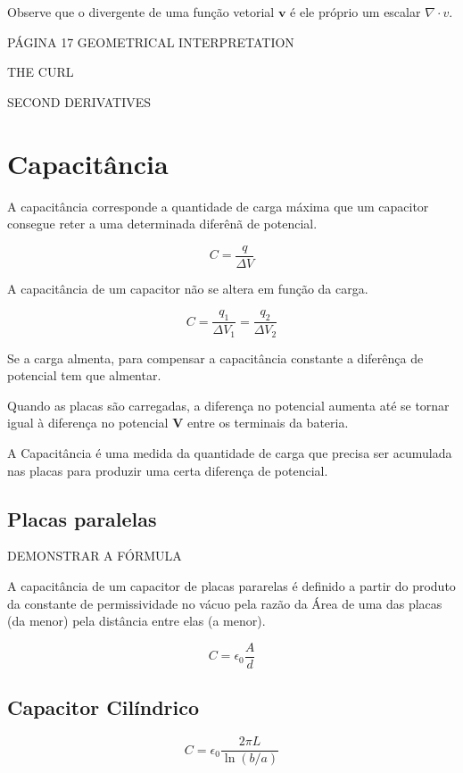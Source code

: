 Observe que o divergente de uma função vetorial $\textbf{v}$ é ele próprio um escalar $\nabla \cdot v$.

PÁGINA 17 GEOMETRICAL INTERPRETATION

THE CURL

SECOND DERIVATIVES

\section{Capacitância}

A capacitância corresponde a quantidade de carga máxima que um capacitor consegue reter a uma determinada diferênã de potencial.

$$C=\dfrac{q}{\Delta V}$$

A capacitância de um capacitor não se altera em função da carga.

$$C=\dfrac{q_1}{\Delta V_1}=\dfrac{q_2}{\Delta V_2}$$

Se a carga almenta, para compensar a capacitância constante a diferênça de potencial tem que almentar.

Quando as placas são carregadas, a diferença no potencial aumenta até se tornar igual à diferença no potencial \textbf{V} entre os terminais da bateria.

A Capacitância é uma medida da quantidade de carga que precisa ser acumulada nas placas para produzir uma certa diferença de potencial.

\subsection{Placas paralelas}

DEMONSTRAR A FÓRMULA

A capacitância de um capacitor de placas pararelas é definido a partir do produto da constante de permissividade no vácuo pela razão da Área de uma das placas (da menor) pela distância entre elas (a menor).

\begin{equation}
    C=\epsilon_0 \dfrac{A}{d}
\end{equation}

\subsection{Capacitor Cilíndrico}

\begin{equation}
    C=\epsilon_0 \dfrac{2\pi L}{\ln (b/a)}
\end{equation}

